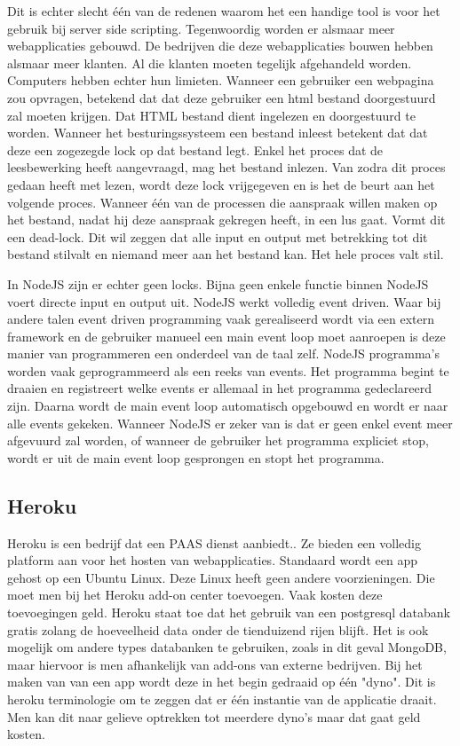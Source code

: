 \documentclass[a4paper,11pt]{article}
\begin{document}
Dit is echter slecht één van de redenen waarom het een handige tool is voor het gebruik bij server side scripting. Tegenwoordig worden er alsmaar meer webapplicaties gebouwd. De bedrijven die deze webapplicaties bouwen hebben alsmaar meer klanten. Al die klanten moeten tegelijk afgehandeld worden. Computers hebben echter hun limieten. Wanneer een gebruiker een webpagina zou opvragen, betekend dat dat deze gebruiker een html bestand doorgestuurd zal moeten krijgen. Dat HTML bestand dient ingelezen en doorgestuurd te worden. Wanneer het besturingssysteem een bestand inleest betekent dat dat deze een zogezegde lock op dat bestand legt. Enkel het proces dat de leesbewerking heeft aangevraagd, mag het bestand inlezen. Van zodra dit proces gedaan heeft met lezen, wordt deze lock vrijgegeven en is het de beurt aan het volgende proces. Wanneer één van de processen die aanspraak willen maken op het bestand, nadat hij deze aanspraak gekregen heeft, in een lus gaat. Vormt dit een dead-lock. Dit wil zeggen dat alle input en output met betrekking tot dit bestand stilvalt en niemand meer aan het bestand kan. Het hele proces valt stil.

In NodeJS zijn er echter geen locks. Bijna geen enkele functie binnen NodeJS voert directe input en output uit. NodeJS werkt volledig event driven. Waar bij andere talen event driven programming vaak gerealiseerd wordt via een extern framework en de gebruiker manueel een main event loop moet aanroepen is deze manier van programmeren een onderdeel van de taal zelf. NodeJS programma's worden vaak geprogrammeerd als een reeks van events. Het programma begint te draaien en registreert welke events er allemaal in het programma gedeclareerd zijn. Daarna wordt de main event loop automatisch opgebouwd en wordt er naar alle events gekeken. Wanneer NodeJS er zeker van is dat er geen enkel event meer afgevuurd zal worden, of wanneer de gebruiker het programma expliciet stop, wordt er uit de main event loop gesprongen en stopt het programma.

\subsection{Heroku}
Heroku is een bedrijf dat een PAAS dienst aanbiedt.\cite{wiki:heroku}. Ze bieden een volledig platform aan voor het hosten van webapplicaties. Standaard wordt een app gehost op een Ubuntu Linux. Deze Linux heeft geen andere voorzieningen. Die moet men bij het Heroku add-on center toevoegen. Vaak kosten deze toevoegingen geld. Heroku staat toe dat het gebruik van een postgresql databank gratis zolang de hoeveelheid data onder de tienduizend rijen blijft. Het is ook mogelijk om andere types databanken te gebruiken, zoals in dit geval MongoDB, maar hiervoor is men afhankelijk van add-ons van externe bedrijven. Bij het maken van van een app wordt deze in het begin gedraaid op één "dyno". Dit is heroku terminologie om te zeggen dat er één instantie van de applicatie draait. Men kan dit naar gelieve optrekken tot meerdere dyno's maar dat gaat geld kosten.
\end{document}

